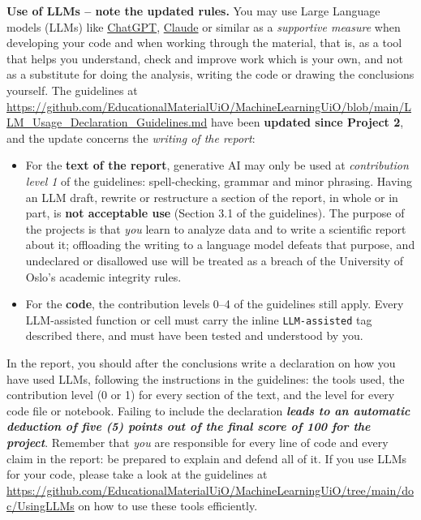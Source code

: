 \documentclass[11pt,a4paper]{article}
\providecommand{\uline}[1]{\textbf{\emph{#1}}}        %
\begin{document}
\textbf{Use of LLMs -- note the updated rules.}  You may use Large Language
models (LLMs) like \href{https://openai.com/chatgpt/}{ChatGPT},
\href{https://claude.ai}{Claude} or similar as a \emph{supportive measure} when
developing your code and when working through the material, that is, as a
tool that helps you understand, check and improve work which is your own,
and not as a substitute for doing the analysis, writing the code or drawing
the conclusions yourself.  The guidelines at
\url{https://github.com/EducationalMaterialUiO/MachineLearningUiO/blob/main/LLM_Usage_Declaration_Guidelines.md}
have been \textbf{updated since Project 2}, and the update concerns the
\emph{writing of the report}:
\begin{itemize}[nosep]
  \item For the \textbf{text of the report}, generative AI may only be used at
        \emph{contribution level 1} of the guidelines: spell-checking,
        grammar and minor phrasing.  Having an LLM draft, rewrite or
        restructure a section of the report, in whole or in part, is
        \textbf{not acceptable use} (Section 3.1 of the guidelines).  The
        purpose of the projects is that \emph{you} learn to analyze data and
        to write a scientific report about it; offloading the writing to a
        language model defeats that purpose, and undeclared or
        disallowed use will be treated as a breach of the University of
        Oslo's academic integrity rules.
  \item For the \textbf{code}, the contribution levels 0--4 of the guidelines
        still apply.  Every LLM-assisted function or cell must carry the
        inline \texttt{LLM-assisted} tag described there, and must have been
        tested and understood by you.
\end{itemize}
In the report, you should after the conclusions write a declaration on how
you have used LLMs, following the instructions in the guidelines: the tools
used, the contribution level (0 or 1) for every section of the text, and the
level for every code file or notebook.  Failing to include the declaration
\uline{leads to an automatic deduction of five (5) points out of the final
score of 100 for the project}.  Remember that \emph{you} are responsible for
every line of code and every claim in the report: be prepared to explain and
defend all of it.  If you use LLMs for your code, please take a look at the
guidelines at
\url{https://github.com/EducationalMaterialUiO/MachineLearningUiO/tree/main/doc/UsingLLMs}
on how to use these tools efficiently.
\end{document}
